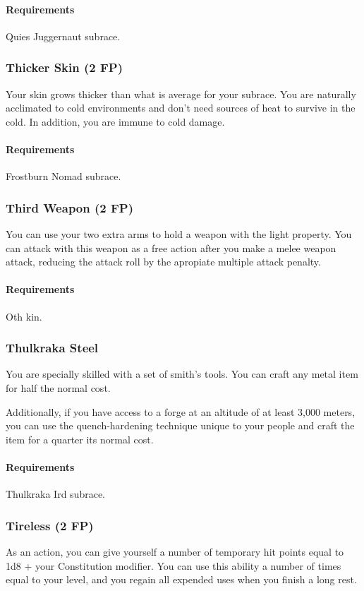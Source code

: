     \paragraph{Requirements} Quies Juggernaut subrace.
\subsubsection{Thicker Skin (2 FP)} \label{feat::thickerskin}
    Your skin grows thicker than what is average for your subrace.
    You are naturally acclimated to cold environments and don't need sources of heat to survive in the cold.
    In addition, you are immune to cold damage.

    \paragraph{Requirements} Frostburn Nomad subrace.
\subsubsection{Third Weapon (2 FP)} \label{feat::thirdweapon}
    You can use your two extra arms to hold a weapon with the light property.
    You can attack with this weapon as a free action after you make a melee weapon attack, reducing the attack roll by the apropiate multiple attack penalty.
    \paragraph{Requirements} Oth kin.
\subsubsection{Thulkraka Steel} \label{feat::thulkrakasteel}
    You are specially skilled with a set of smith's tools.
    You can craft any metal item for half the normal cost.

    Additionally, if you have access to a forge at an altitude of at least 3,000 meters, you can use the quench-hardening technique unique to your people and craft the item for a quarter its normal cost.
    \paragraph{Requirements} Thulkraka Ird subrace.
\subsubsection{Tireless (2 FP)} \label{feat::tireless}
    As an action, you can give yourself a number of temporary hit points equal to 1d8 + your Constitution modifier.
    You can use this ability a number of times equal to your level, and you regain all expended uses when you finish a long rest.

